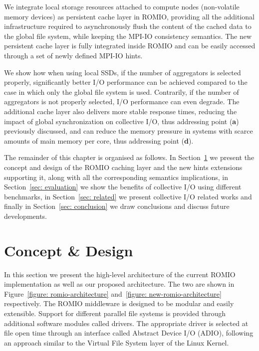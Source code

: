 We integrate local storage resources attached to compute nodes (non-volatile memory devices) as persistent cache layer in ROMIO, providing all the additional infrastructure required to asynchronously flush the content of the cached data to the global file 
system, while keeping the MPI-IO consistency semantics. The new persistent cache layer is fully integrated inside ROMIO and can be easily accessed through a set of newly defined MPI-IO hints.

We show how when using local SSDs, if the number of aggregators is selected properly, significantly better I/O performance can be achieved compared to the case in which only the global file system is used. Contrarily, if the number of aggregators is not 
properly selected, I/O performance can even degrade. The additional cache layer also delivers more stable response times, reducing the impact of global synchronization on collective I/O, thus addressing point (\textbf{a}) previously discussed, and can reduce 
the memory pressure in systems with scarce amounts of main memory per core, thus addressing point (\textbf{d}).

The remainder of this chapter is organised as follows. In Section~\ref{sec: concept} we present the concept and design of the ROMIO caching layer and the new hints extensions supporting it, along with all the corresponding semantics implications, in 
Section~\ref{sec: evaluation} we show the benefits of collective I/O using different benchmarks, in Section~\ref{sec: related} we present collective I/O related works and finally in Section~\ref{sec: conclusion} we draw conclusions and discuss future 
developments.

\section{Concept \& Design}
\label{sec: concept}
In this section we present the high-level architecture of the current ROMIO implementation as well as our proposed architecture. The two are shown in Figure~\ref{figure: romio-architecture} and~\ref{figure: new-romio-architecture} respectively. The ROMIO 
middleware is designed to be modular and easily extensible. Support for different parallel file systems is provided through additional software modules called drivers. The appropriate driver is selected at file open time through an interface called Abstract 
Device I/O (ADIO), following an approach similar to the Virtual File System layer of the Linux Kernel. 

